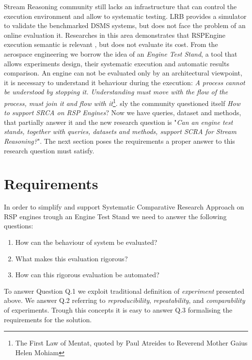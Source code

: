 Stream Reasoning community still lacks an infrastructure that can control the execution environment and allow to systematic testing. LRB provides a simulator to validate the benchmarked DSMS systems, but does not face the problem of an online evaluation it. Researches in this area demonstrates that RSPEngine execution semantic is relevant \cite{Botan:2010:SMA:1920841.1920874}, but does not evaluate its cost. From the aerospace engineering we borrow the idea of an \textit{Engine Test Stand}, a tool that allows experiments design, their systematic execution and automatic results comparison. An engine can not be evaluated only by an architectural viewpoint, it is necessary to understand it behaviour during the execution: \textit{A process cannot be understood by stopping it. Understanding must move with the flow of the process, must join it and flow with it}\footnote{The First Law of Mentat, quoted by Paul Atreides to Reverend Mother Gaius Helen Mohiam}. sly the community questioned itself \textit{How to support SRCA on RSP Engines}? Now we have queries, dataset and methods, that partially answer it and the new research question is "\textit{Can an engine test stands, together with queries, datasets and methods, support SCRA for Stream Reasoning?}". The next section poses the requirements a proper answer to this research question must satisfy.

\section{Requirements} \label{sec:requirements}

In order to simplify and support Systematic Comparative Research Approach on RSP engines trough an Engine Test Stand we need to answer the following questions: 
\begin{enumerate}
\item[Q.1] How can the behaviour of system be evaluated? 
\item[Q.2] What makes this evaluation rigorous? 
\item[Q.3] How can this rigorous evaluation be automated?
\end{enumerate} To answer Question Q.1 we exploit traditional definition of \textit{experiment} presented above. We answer Q.2 referring to \textit{reproducibility}, \textit{repeatability}, and \textit{comparability} of experiments. Trough this concepts it is easy to answer Q.3 formalising the requirements for the solution.

